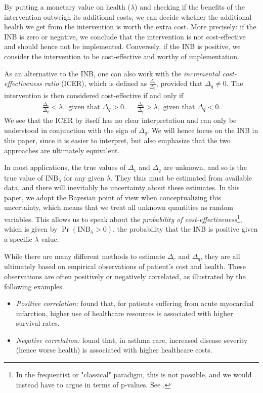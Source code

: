 \documentclass[aoas,preprint]{imsart}
\theoremstyle{plain}
\theoremstyle{definition}
\theoremstyle{remark}
\theoremstyle{remark}
\begin{document}
By putting a monetary value on health ($\lambda$) and checking if the benefits of the intervention outweigh its additional costs, we can decide whether the additional health we get from the intervention is worth the extra cost. More precisely: if the INB is zero or negative, we conclude that the intervention is not cost-effective and should hence not be implemented. Conversely, if the INB is positive, we consider the intervention to be cost-effective and worthy of implementation. 

As an alternative to the INB, one can also work with the \emph{incremental cost-effectiveness ratio} (ICER), which is defined as $\frac{\Delta_c}{\Delta_q}$, provided that $\Delta_q \neq 0$. The intervention is then considered cost-effective if and only if
\begin{align*}
\frac{\Delta_c}{\Delta_q} < \lambda, \text{ given that }\Delta_q > 0. 
&& \frac{\Delta_c}{\Delta_q} > \lambda, \text{ given that }\Delta_q < 0. 
\end{align*}
We see that the ICER by itself has no clear interpretation and can only be understood in conjunction with the sign of $\Delta_q$. We will hence focus on the INB in this paper, since it is easier to interpret, but also emphasize that the two approaches are ultimately equivalent.

In most applications, the true values of $\Delta_c$ and $\Delta_q$ are unknown, and so is the true value of $\text{INB}_{\lambda}$ for any given $\lambda$. They thus must be estimated from available data, and there will inevitably be uncertainty about these estimates. In this paper, we adopt the Bayesian point of view when conceptualizing this uncertainty, which means that we treat all unknown quantities as random variables. This allows us to speak about the \emph{probability of cost-effectiveness}\footnote{In the frequentist or "classical" paradigm, this is not possible, and we would instead have to argue in terms of p-values. See \citet{lothgren2000definition}.}, which is given by $\Pr(\text{INB}_{\lambda} > 0)$, the probability that the INB is positive given a specific $\lambda$ value.

While there are many different methods to estimate $\Delta_c$ and $\Delta_q$, they are all ultimately based on empirical observations of patient's cost and health. These observations are often positively or negatively correlated, as illustrated by the following examples. 

\begin{itemize}
    \item \emph{Positive correlation:} \citet{stargardt2014measuring} found that, for patients suffering from acute myocardial infarction, higher use of healthcare resources is associated with higher survival rates. 
    \item \emph{Negative correlation:} \citep{dominguez2015cost} found that, in asthma care, increased disease severity (hence worse health) is associated with higher healthcare costs.
\end{itemize}
\end{document}
